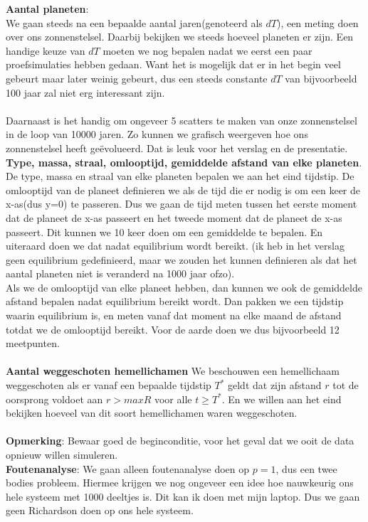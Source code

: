 \documentclass[11pt]{article}
\begin{document}
\textbf{Aantal planeten}:\\
We gaan steeds na een bepaalde aantal jaren(genoteerd als $dT$), een meting doen over ons zonnenstelsel. Daarbij bekijken we steeds hoeveel planeten er zijn. Een handige keuze van $dT$ moeten we nog bepalen nadat we eerst een paar proefsimulaties hebben gedaan. Want het is mogelijk dat er in het begin veel gebeurt maar later weinig gebeurt, dus een steeds constante $dT$ van bijvoorbeeld 100 jaar zal niet erg interessant zijn.\\
\\
Daarnaast is het handig om ongeveer 5 scatters te maken van onze zonnenstelsel in de loop van 10000 jaren. Zo kunnen we grafisch weergeven hoe ons zonnenstelsel heeft ge\"{e}volueerd. Dat is leuk voor het verslag en de presentatie.\\ 
\textbf{Type, massa, straal, omlooptijd, gemiddelde afstand van elke planeten}.\\
De type, massa en straal van elke planeten bepalen we aan het eind tijdstip. De omlooptijd van de planeet definieren we als de tijd die er nodig is om een keer de x-as(dus y=0) te passeren. Dus we gaan de tijd meten tussen het eerste moment dat de planeet de x-as passeert en het tweede moment dat de planeet de x-as passeert. Dit kunnen we 10 keer doen om een gemiddelde te bepalen. En uiteraard doen we dat nadat equilibrium wordt bereikt. (ik heb in het verslag geen equilibrium gedefinieerd, maar we zouden het kunnen definieren als dat het aantal planeten niet is veranderd na 1000 jaar ofzo).\\

Als we de omlooptijd van elke planeet hebben, dan kunnen we ook de gemiddelde afstand bepalen nadat equilibrium bereikt wordt. Dan pakken we een tijdstip waarin equilibrium is, en meten vanaf dat moment na elke maand de afstand totdat we de omlooptijd bereikt. Voor de aarde doen we dus bijvoorbeeld 12 meetpunten.\\
\\
\textbf{Aantal weggeschoten hemellichamen}
We beschouwen een hemellichaam weggeschoten als er vanaf een bepaalde tijdstip $T^*$ geldt dat zijn afstand $r$ tot de oorsprong voldoet aan $r>maxR$ voor alle $t\geq T^*$. En we willen aan het eind bekijken hoeveel van dit soort hemellichamen waren weggeschoten.\\
\\
\textbf{Opmerking}: Bewaar goed de beginconditie, voor het geval dat we ooit de data opnieuw willen simuleren.\\
\textbf{Foutenanalyse}:
We gaan alleen foutenanalyse doen op $p=1$, dus een twee bodies probleem. Hiermee krijgen we nog ongeveer een idee hoe nauwkeurig ons hele systeem met 1000 deeltjes is. Dit kan ik doen met mijn laptop. Dus we gaan geen Richardson doen op ons hele systeem.  
\end{document}
